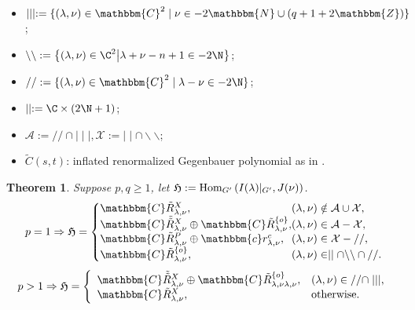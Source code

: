 \documentclass[portrait,final,paperwidth=90cm,paperheight=120cm,fontscale=0.3]{baposter}
\newcommand{\assign}{:=}
\newcommand{\tmop}[1]{\ensuremath{\operatorname{#1}}}
\newtheorem{theorem}{Theorem}
\newcommand{\Hom}{\mbox{\normalfont Hom}}
\newtheorem{corollary}[theorem]{Corollary}
\theoremstyle{definition}
\newcommand{\IlambdaGprime}{I(\lambda)\kern-0.3em\mid_{G'}}
\newcommand{\SBO}{\Hom_{G'}\left(\IlambdaGprime,J(\nu) \right)}
\newcommand{\mm}{\mid\mid}
\newcommand{\bb}{\backslash\backslash}
\renewcommand{\ss}{//}
\begin{document}
\begin{poster}
 {
\begin{itemize}
	\item $\mid \mid \mid \assign \{ (\lambda, \nu) \in \mathbbm{C}^2 \mid \nu \in
	- 2\mathbbm{N} \cup (q + 1 + 2\mathbbm{Z}) \}$;
	\item $\backslash\backslash:=\mysetn{(\lambda,\nu)\in\C^2}{\lambda+\nu-n+1\in-2\N}$;
	\item $/ / \assign
	\{ (\lambda, \nu) \in \mathbbm{C}^2 \mid \lambda - \nu \in
	-2\N \}$;
	\item$ \mid\mid:=\C\times\left( 2\N+1 \right)$;
	\item $\mathcal{A}:=\ss\cap\mid\mid\mid, \mathcal{X}:=\mm\cap\bb$;
	\item $\tilde{C}(s,t)$: inflated renormalized Gegenbauer polynomial as in \cite[(16.3)]{kobayashi2015symmetry}.
	\end{itemize}
 }
{
\begin{theorem}\label{thm:classif}
	Suppose $p,q\ge1$, let $\mathfrak{H}:=\SBO$.
	\[ p = 1 \Rightarrow \mathfrak{H} = \left\{
	\begin{array}{@{}l@{}l@{}}
		\mathbbm{C}\tilde{R}^X_{\lambda, \nu}, & (\lambda, \nu) \notin  \mathcal{A}\cup \mathcal{X}
     ,\\
     \mathbbm{C} \tilde{\tilde{R}}^X_{\lambda, \nu} \oplus \mathbbm{C}\tilde{R}^{\{ o
     \}}_{\lambda, \nu}, & (\lambda, \nu) \in \mathcal{A} -
     \mathcal{X},\\
     \mathbbm{C}\tilde{R}^P_{\lambda, \nu} \oplus \mathbbm{c}r^c_{\lambda, \nu}, &
     (\lambda, \nu) \in \mathcal{X} - / /,\\
     \mathbbm{C}\tilde{R}^{\{ o \}}_{\lambda, \nu}, & (\lambda, \nu) \in \mid \mid
     \cap \backslash\backslash \cap / /.
   \end{array} \right. \]
   \[ p > 1 \Rightarrow \mathfrak{H} = \left\{
   \begin{array}{ll}
     \mathbbm{C} \tilde{\tilde{R}}^X_{\lambda, \nu} \oplus \mathbbm{C}\tilde{R}^{\{ o
     \}}_{\lambda, \nu \lambda, \nu}, & (\lambda, \nu) \in / / \cap \mid \mid
     \mid,\\
     \mathbbm{C}\tilde{R}^X_{\lambda, \nu}, & \tmop{otherwise.}
   \end{array} \right. \]
\end{theorem}
}
\end{poster}
\end{document}
